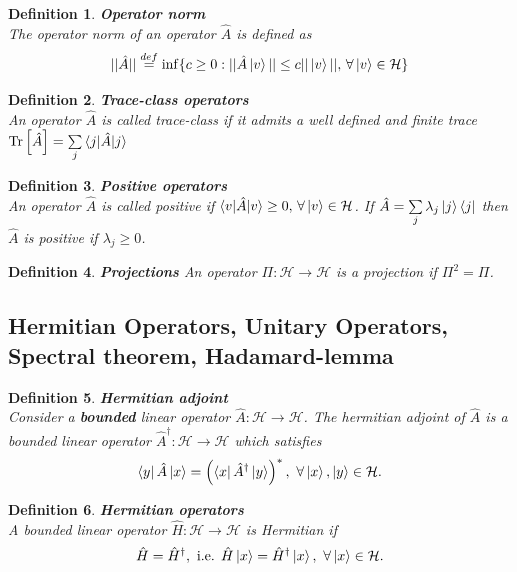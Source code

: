\documentclass[12pt, a4paper,  nobibnotes]{article}
\newcommand{\Tr}[1]{\mathrm{Tr}\left[#1\right]}
\newtheorem{definition}{Definition}
\begin{document}
\begin{definition}
    \textbf{Operator norm}\\
    The operator norm of an operator $\hat A$ is defined as 
    \begin{equation*}
        ||\hat A|| \overset{def}{=} \inf\{c\geq 0 : ||\hat A\ket v || \leq c ||\ket v||,\,\forall \ket v \in \mathcal H \}
    \end{equation*}
\end{definition}

\begin{definition}
   \textbf{Trace-class operators}\\
   An operator $\hat A$ is called trace-class if it admits a well defined and finite trace 
   $\Tr{\hat A} = \sum\limits_j\braket{j|\hat A|j}$
\end{definition}

\begin{definition}
    \textbf{Positive operators}\\
    An operator $\hat A$ is called positive if $\braket{v|\hat A|v} \geq 0,\,\forall \ket v \in \mathcal{H}$.
    If $\hat A = \sum\limits_j \lambda_j \ket j \bra j$ then $\hat A$ is positive if $\lambda_j \geq 0$.
\end{definition}

\begin{definition}
    \textbf{Projections}
    An operator $\Pi:\mathcal H \rightarrow \mathcal H$ is a projection if $\Pi^2=\Pi$.
\end{definition}

\subsection{Hermitian Operators, Unitary Operators, Spectral theorem, Hadamard-lemma}
\begin{definition}
    \textbf{Hermitian adjoint}
    \\Consider a \textbf{bounded} linear operator $\hat A: \mathcal H \rightarrow \mathcal H$. The hermitian adjoint of 
    $\hat A$ is a bounded linear operator $\hat A^\dagger : \mathcal H \rightarrow \mathcal H$ which satisfies
    \begin{equation}
        \bra y \hat A \ket x = \left( \bra x \hat A^\dagger \ket y \right)^*, ~\forall \ket x, \ket y \in \mathcal H.
    \end{equation}
\end{definition}

\begin{definition}
    \textbf{Hermitian operators}
    \\ A bounded linear operator $\hat H : \mathcal H\rightarrow \mathcal H$ is Hermitian if 
    \begin{equation}
        \hat H = \hat H^\dagger, \textrm{ i.e. } \hat H\ket x = \hat H^\dagger \ket x, ~\forall \ket x \in \mathcal H.
    \end{equation}
\end{definition}
\end{document}
